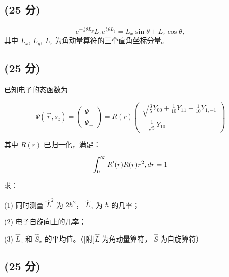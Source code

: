 \subsection{(25 分)}
\[    e^{-\frac{i}{\hbar}\theta L_y} L_z e^{\frac{i}{\hbar}\theta L_y} = L_x \sin\theta + L_z \cos\theta, ~\]
    其中 $L_x$, $L_y$, $L_z$ 为角动量算符的三个直角坐标分量。
\subsection{(25 分)}

已知电子的态函数为

\[
\Psi(\vec{r}, s_z) = \begin{pmatrix} \Psi_+ \\ \Psi_- \end{pmatrix} = R(r) \begin{pmatrix} \sqrt{\frac{3}{5}} Y_{00} + \frac{1}{10} Y_{11} + \frac{1}{10} Y_{1,-1} \\ -\frac{1}{\sqrt{5}} Y_{10} \end{pmatrix}~
\]

其中 \( R(r) \) 已归一化，满足：

\[
\int_0^\infty R'(r) R(r) r^2 \\, dr = 1~
\]

求：

(1) 同时测量 \( \hat{L}^2 \) 为 \( 2\hbar^2 \)， \( \hat{L}_z \) 为 \( \hbar \)  的几率；  

(2) 电子自旋向上的几率；  

(3) \( \hat{L}_z \) 和 \( \hat{S}_x \) 的平均值。（[附]\( \hat{L} \) 为角动量算符， \( \hat{S} \) 为自旋算符）
\subsection{(25 分)}
